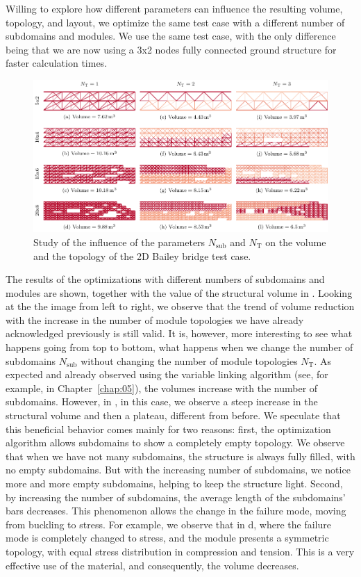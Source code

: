 Willing to explore how different parameters can influence the resulting volume, topology, and layout, we optimize the same test case with a different number of subdomains and modules. We use the same test case, with the only difference being that we are now using a 3x2 nodes fully connected ground structure for faster calculation times.

\begin{figure}
    \centering
    \includegraphics{figures/06_DMO/00_tug_bench_size/size.pdf}
    \caption{Study of the influence of the parameters $N_\text{sub}$ and $N_\text{T}$ on the volume and the topology of the 2D Bailey bridge test case.}
    \label{fig:06_size_res}
\end{figure}

The results of the optimizations with different numbers of subdomains and modules are shown, together with the value of the structural volume in . Looking at the the image from left to right, we observe that the trend of volume reduction with the increase in the number of module topologies we have already acknowledged previously is still valid. It is, however, more interesting to see what happens going from top to bottom, \ie what happens when we change the number of subdomains $N_\text{sub}$ without changing the number of module topologies $N_\text{T}$. As expected and already observed using the variable linking algorithm (see, for example,  in Chapter~\ref{chap:05}), the volumes increase with the number of subdomains. However, in , in this case, we observe a steep increase in the structural volume and then a plateau, different from before. We speculate that this beneficial behavior comes mainly for two reasons: first, the optimization algorithm allows subdomains to show a completely empty topology. We observe that when we have not many subdomains, the structure is always fully filled, with no empty subdomains. But with the increasing number of subdomains, we notice more and more empty subdomains, helping to keep the structure light. Second, by increasing the number of subdomains, the average length of the subdomains' bars decreases. This phenomenon allows the change in the failure mode, moving from buckling to stress. For example, we observe that in d, where the failure mode is completely changed to stress, and the module presents a symmetric topology, with equal stress distribution in compression and tension. This is a very effective use of the material, and consequently, the volume decreases.


